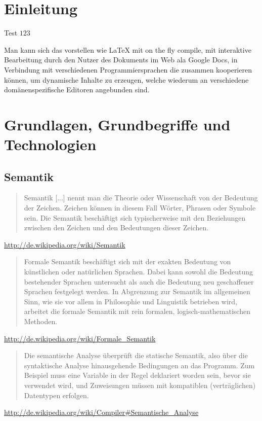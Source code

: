 \chapter{Einleitung}

\citep{default}

Test $123$ \citep{6902013}

Man kann sich das vorstellen wie LaTeX mit on the fly compile,
mit interaktive Bearbeitung durch den Nutzer des Dokuments im Web ala
Google Docs, in Verbindung mit verschiedenen Programmiersprachen
die zusammen kooperieren können, um dynamische Inhalte zu erzeugen,
welche wiederum an verschiedene domänenspezifische Editoren angebunden sind.

\chapter{Grundlagen, Grundbegriffe und Technologien}

\section{Semantik}

\begin{quote}Semantik [...] nennt man die Theorie oder Wissenschaft von der Bedeutung der Zeichen.
Zeichen können in diesem Fall Wörter, Phrasen oder Symbole sein. Die Semantik beschäftigt sich 
typischerweise mit den Beziehungen zwischen den Zeichen und den Bedeutungen dieser Zeichen.
\end{quote}
\url{http://de.wikipedia.org/wiki/Semantik}

\begin{quote}Formale Semantik beschäftigt sich mit der exakten Bedeutung von künstlichen
oder natürlichen Sprachen. Dabei kann sowohl die Bedeutung bestehender Sprachen untersucht
als auch die Bedeutung neu geschaffener Sprachen festgelegt werden.
In Abgrenzung zur Semantik im allgemeinen Sinn, wie sie vor allem in Philosophie und Linguistik
betrieben wird, arbeitet die formale Semantik mit rein formalen, logisch-mathematischen Methoden.
\end{quote}
\url{http://de.wikipedia.org/wiki/Formale_Semantik}

\begin{quote}Die semantische Analyse überprüft die statische Semantik,
also über die syntaktische Analyse hinausgehende Bedingungen an das Programm.
Zum Beispiel muss eine Variable in der Regel deklariert worden sein, bevor sie verwendet wird,
und Zuweisungen müssen mit kompatiblen (verträglichen) Datentypen erfolgen.
\end{quote}
\url{http://de.wikipedia.org/wiki/Compiler#Semantische_Analyse}

